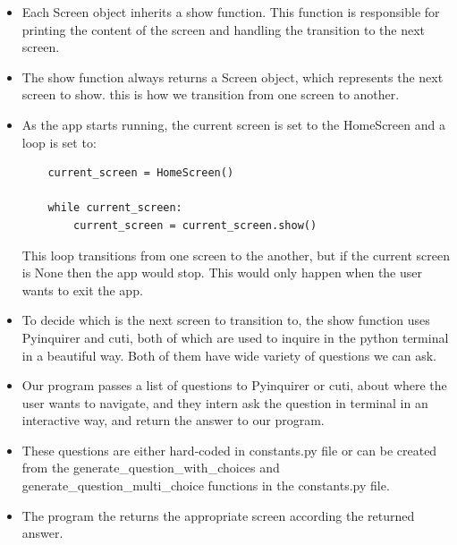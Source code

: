 \documentclass[11pt]{report}
\begin{document}
\begin{itemize}
    \item Each Screen object inherits a show function. This function is responsible for printing the content of the screen and handling the transition to the next screen. \\
    
    \item The show function always returns a Screen object, which represents the next screen to show. this is how we transition from one screen to another.\\
    
    \item As the app starts running, the current screen is set to the HomeScreen and a loop is set to:
    
    
    \begin{verbatim}
    current_screen = HomeScreen()
    
    while current_screen:
        current_screen = current_screen.show()
    \end{verbatim}
    
    
    This loop transitions from one screen to the another, but if the current screen is None then the app would stop. This would only happen when the user wants to exit the app.  
    
    
    \item To decide which is the next screen to transition to, the show function uses Pyinquirer and cuti, both of which are used to inquire in the python terminal in a beautiful way. Both of them have wide variety of questions we can ask.\\
    
    \item Our program passes a list of questions to Pyinquirer or cuti, about where the user wants to navigate, and they intern ask the question in terminal in an interactive way, and return the answer to our program.\\
    
    \item These questions are either hard-coded in constants.py file or can be created from the generate\_question\_with\_choices and generate\_question\_multi\_choice functions in the constants.py file. \\
    
    \item The program the returns the appropriate screen according the returned answer.
\end{itemize}~\\
\end{document}
